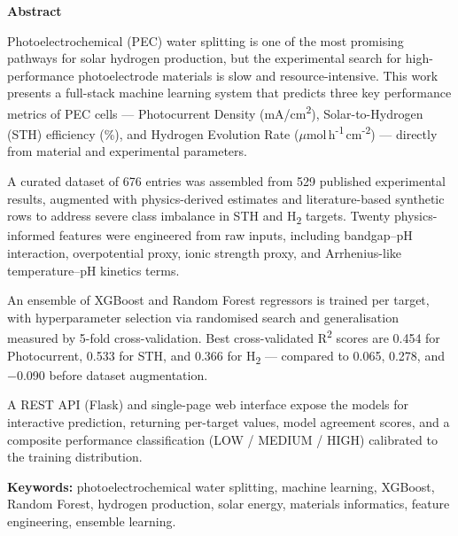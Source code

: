 \newpage
\pagestyle{plain}

\begin{center}
    \Large
    \textbf{Abstract}
\end{center}

\vspace{0.5cm}

Photoelectrochemical (PEC) water splitting is one of the most promising pathways for
solar hydrogen production, but the experimental search for high-performance
photoelectrode materials is slow and resource-intensive.
This work presents a full-stack machine learning system that predicts three key
performance metrics of PEC cells — Photocurrent Density (mA/cm\textsuperscript{2}),
Solar-to-Hydrogen (STH) efficiency (\%), and Hydrogen Evolution Rate
($\mu$mol\,h\textsuperscript{-1}\,cm\textsuperscript{-2}) — directly from
material and experimental parameters.

A curated dataset of 676 entries was assembled from 529 published experimental
results, augmented with physics-derived estimates and literature-based synthetic
rows to address severe class imbalance in STH and H\textsubscript{2} targets.
Twenty physics-informed features were engineered from raw inputs, including
bandgap--pH interaction, overpotential proxy, ionic strength proxy, and
Arrhenius-like temperature--pH kinetics terms.

An ensemble of XGBoost and Random Forest regressors is trained per target, with
hyperparameter selection via randomised search and generalisation measured by
5-fold cross-validation.
Best cross-validated R\textsuperscript{2} scores are 0.454 for Photocurrent,
0.533 for STH, and 0.366 for H\textsubscript{2} — compared to 0.065, 0.278,
and $-$0.090 before dataset augmentation.

A REST API (Flask) and single-page web interface expose the models for
interactive prediction, returning per-target values, model agreement scores,
and a composite performance classification (LOW / MEDIUM / HIGH) calibrated to
the training distribution.

\vspace{0.5cm}
\noindent\textbf{Keywords:} photoelectrochemical water splitting, machine learning,
XGBoost, Random Forest, hydrogen production, solar energy, materials informatics,
feature engineering, ensemble learning.
